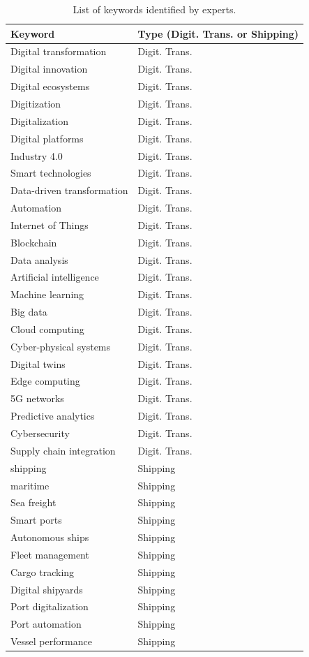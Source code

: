 \documentclass[a4paper, review, endfloat, doubleblind, authoryear]{elsarticle}
\begin{document}
	\begin{table}[h]
		\centering
		\caption{List of keywords identified by experts.}
		\begin{tabularx}{\linewidth}{XX}
			\hline
			Keyword& Type (Digit. Trans. or Shipping) \\
			\hline
			Digital transformation & Digit. Trans. \\
			Digital innovation & Digit. Trans. \\
			Digital ecosystems & Digit. Trans. \\
			Digitization & Digit. Trans. \\
			Digitalization & Digit. Trans. \\
			Digital platforms & Digit. Trans. \\
			Industry 4.0 & Digit. Trans. \\
			Smart technologies & Digit. Trans. \\
			Data-driven transformation & Digit. Trans. \\
			Automation & Digit. Trans. \\
			Internet of Things & Digit. Trans. \\
			Blockchain & Digit. Trans. \\
			Data analysis & Digit. Trans. \\
			Artificial intelligence & Digit. Trans. \\
			Machine learning & Digit. Trans. \\
			Big data & Digit. Trans. \\
			Cloud computing & Digit. Trans. \\
			Cyber-physical systems & Digit. Trans. \\
			Digital twins & Digit. Trans. \\
			Edge computing & Digit. Trans. \\
			5G networks & Digit. Trans. \\
			Predictive analytics & Digit. Trans. \\
			Cybersecurity & Digit. Trans. \\
			Supply chain integration & Digit. Trans. \\
			shipping & Shipping \\
			maritime & Shipping \\
			Sea freight & Shipping \\
			Smart ports & Shipping \\
			Autonomous ships & Shipping \\
			Fleet management & Shipping \\
			Cargo tracking & Shipping \\
			Digital shipyards & Shipping \\
			Port digitalization & Shipping \\
			Port automation & Shipping \\
			Vessel performance & Shipping \\
			\hline
		\end{tabularx}
		\label{tab:keywords}
	\end{table}
	
\end{document}
